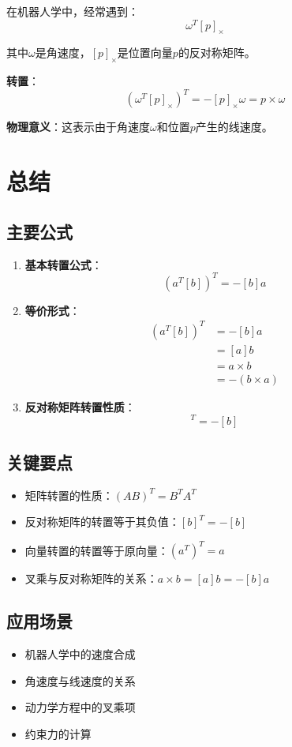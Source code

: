 \documentclass[12pt,a4paper]{article}
\begin{document}
在机器人学中，经常遇到：
\begin{equation}
\omega^T [p]_{\times}
\end{equation}

其中$\omega$是角速度，$[p]_{\times}$是位置向量$p$的反对称矩阵。

\textbf{转置}：
\begin{equation}
(\omega^T [p]_{\times})^T = -[p]_{\times} \omega = p \times \omega
\end{equation}

\textbf{物理意义}：这表示由于角速度$\omega$和位置$p$产生的线速度。

\section{总结}

\subsection{主要公式}

\begin{enumerate}
\item \textbf{基本转置公式}：
\begin{equation}
(a^T [b])^T = -[b] a
\end{equation}

\item \textbf{等价形式}：
\begin{align}
(a^T [b])^T &= -[b] a \\
&= [a] b \\
&= a \times b \\
&= -(b \times a)
\end{align}

\item \textbf{反对称矩阵转置性质}：
\begin{equation}
[b]^T = -[b]
\end{equation}
\end{enumerate}

\subsection{关键要点}

\begin{itemize}
\item 矩阵转置的性质：$(AB)^T = B^T A^T$
\item 反对称矩阵的转置等于其负值：$[b]^T = -[b]$
\item 向量转置的转置等于原向量：$(a^T)^T = a$
\item 叉乘与反对称矩阵的关系：$a \times b = [a] b = -[b] a$
\end{itemize}

\subsection{应用场景}

\begin{itemize}
\item 机器人学中的速度合成
\item 角速度与线速度的关系
\item 动力学方程中的叉乘项
\item 约束力的计算
\end{itemize}
\end{document}
